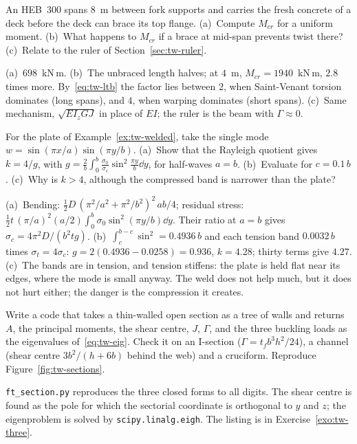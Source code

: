 \label{exo:tw-girder}
%
An HEB~300 spans $8$~m between fork supports and carries the fresh concrete of a deck before the deck can brace
its top flange. (a)~Compute $M_{cr}$ for a uniform moment. (b)~What happens to $M_{cr}$ if a brace at mid-span
prevents twist there? (c)~Relate to the ruler of Section~\ref{sec:tw-ruler}.
\begin{solution}
(a)~$698$~kN\,m. (b)~The unbraced length halves; at $4$~m, $M_{cr} = 1940$~kN\,m, $2.8$ times more. By~\eqref{eq:tw-ltb} the
factor lies between $2$, when Saint-Venant torsion dominates (long spans), and $4$, when warping dominates
(short spans).
(c)~Same mechanism, $\sqrt{EI_zGJ}$ in place of $EI$; the ruler is the beam with $\Gamma \approx 0$.
\end{solution}

\label{exo:tw-welded}
%
For the plate of Example~\ref{ex:tw-welded}, take the single mode $w = \sin(\pi x/a)\sin(\pi y/b)$. (a)~Show that the
Rayleigh quotient gives $k = 4/g$, with $g = \displaystyle\frac2b\int_0^b\frac{\sigma_0}{\sigma_c}\sin^2\frac{\pi y}b\dd y$, for half-waves
$a = b$. (b)~Evaluate for $c = 0.1\,b$. (c)~Why is $k > 4$, although the compressed band is narrower than the plate?
\begin{solution}
(a)~Bending: $\tfrac12D\,(\pi^2/a^2 + \pi^2/b^2)^2\,ab/4$; residual stress: $\tfrac12t\,(\pi/a)^2(a/2)\displaystyle\int_0^b\sigma_0\sin^2(\pi y/b)\dd y$.
Their ratio at $a = b$ gives $\sigma_c = 4\pi^2D/(b^2tg)$. (b)~$\displaystyle\int_c^{b-c}\sin^2 = 0.4936\,b$ and each tension band
$0.0032\,b$ times $\sigma_t = 4\sigma_c$: $g = 2(0.4936 - 0.0258) = 0.936$, $k = 4.28$; thirty terms give $4.27$.
(c)~The bands are in tension, and tension stiffens: the plate is held flat near its edges, where the mode is
small anyway. The weld does not help much, but it does not hurt either; the danger is the compression it
creates.
\end{solution}


\label{exo:tw-computer-section}
%
Write a code that takes a thin-walled open section as a tree of walls and returns $A$, the principal
moments, the shear centre, $J$, $\Gamma$, and the three buckling loads as the eigenvalues of~\eqref{eq:tw-eig}.
Check it on an I-section ($\Gamma = t_fb^3h^2/24$), a channel (shear centre $3b^2/(h + 6b)$ behind the web) and a
cruciform. Reproduce Figure~\ref{fig:tw-sections}.
\begin{solution}
\texttt{ft\_section.py} reproduces the three closed forms to all digits. The shear centre is found as the pole
for which the sectorial coordinate is orthogonal to $y$ and $z$; the eigenproblem is solved by
\texttt{scipy.linalg.eigh}. The listing is in Exercise~\ref{exo:tw-three}.
\end{solution}

